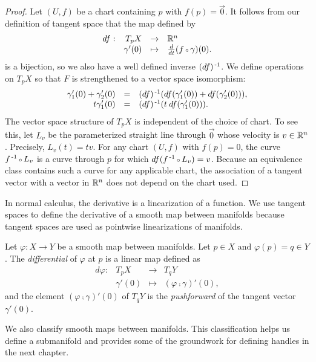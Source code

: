\begin{proof}
	Let $(U,f)$ be a chart containing $p$ with $f(p)=\vec{0}$.
	It follows from our definition of tangent space that the map defined by
	\[
		\begin{array}{crcl}
			df : & T_p X & \to & \RRN \\
			& \gamma'(0) & \mapsto & \Ddt(f\comp \gamma)(0) .
		\end{array}
	\]
	is a bijection, so we also have a well defined inverse $(df)^{\,\text{-}1}$.
	We define operations on $T_p X$ so that $F$ is strengthened to a vector space isomorphism:
	\[
		\begin{array}{rcl}
			\gamma_1'(0)+\gamma_2'(0) & = & (df)^{\,\text{-}1}(df(\gamma_1'(0))+df(\gamma_2'(0))), \\
			t\gamma_1'(0) & = & (df)^{\,\text{-}1}(t\:df(\gamma_1'(0))).
		\end{array}
	\]
	The vector space structure of $T_p X$ is independent of the choice of chart.
	To see this, let $L_v$ be the parameterized straight line through $\vec{0}$ whose velocity is $v\in\mathbb{R}^n$.
	Precisely, $L_v(t)=tv.$
	For any chart $(U,f)$ with $f(p)=0$, the curve $f\inv\comp L_v$ is a curve through $p$ for which $df(f\inv\comp L_v)=v$.
	Because an equivalence class contains such a curve for any applicable chart, the association of a tangent vector with a vector in $\mathbb{R}^n$ does not depend on the chart used.
\end{proof}

In normal calculus, the derivative is a linearization of a function.
We use tangent spaces to define the derivative of a smooth map between manifolds because tangent spaces are used as pointwise linearizations of manifolds.

\begin{defn}[Differential]
	Let $\varphi:X\to Y$ be a smooth map between manifolds.
	Let $p\in X$ and $\varphi(p)=q\in Y$.
	The \emph{differential} of $\varphi$ at $p$ is a linear map defined as
	\[
		\begin{array}{crcl}
			d\varphi: & T_p X & \to & T_q Y\\
					  & \gamma'(0) & \mapsto & (\varphi\comp\gamma)'(0),
		\end{array}
	\]
	and the element $(\varphi\comp\gamma)'(0)$ of $T_q Y$ is the \emph{pushforward} of the tangent vector $\gamma'(0)$.
\end{defn}

We also classify smooth maps between manifolds.
This classification helps us define a submanifold and provides some of the groundwork for defining handles in the next chapter.

